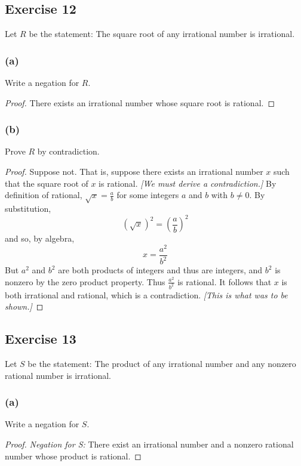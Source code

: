 \documentclass[14pt]{extarticle}
\begin{document}
\subsection{Exercise 12}
Let $R$ be the statement: The square root of any irrational number is irrational.

\subsubsection{(a)}
Write a negation for $R$.

\begin{proof}
There exists an irrational number whose square root is rational.
\end{proof}

\subsubsection{(b)}
Prove $R$ by contradiction.

\begin{proof}
Suppose not. That is, suppose there exists an irrational number $x$ such that the square root of $x$ is rational. {\it [We must derive a contradiction.]} By definition of rational, $\sqrt{x} = \frac{a}{b}$ for some integers $a$ and $b$ with $b \neq 0$. By substitution,
\[
(\sqrt{x})^2 = \left(\frac{a}{b}\right)^2
\]
and so, by algebra,
\[
x = \frac{a^2}{b^2}
\]
But $a^2$ and $b^2$ are both products of integers and thus
are integers, and $b^2$ is nonzero by the zero product
property. Thus $\frac{a^2}{b^2}$ is rational. It follows that $x$ is both irrational and rational, which is a contradiction. {\it [This is what was to be shown.]}
\end{proof}

\subsection{Exercise 13}
Let $S$ be the statement: The product of any irrational number and any nonzero rational number is irrational.

\subsubsection{(a)}
Write a negation for $S$.

\begin{proof}
{\it Negation for S:} There exist an irrational number and a nonzero rational number whose product is rational.
\end{proof}
\end{document}
